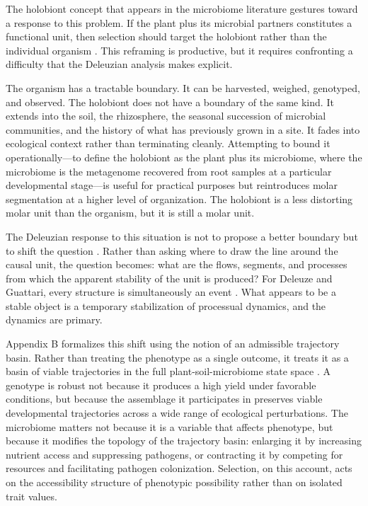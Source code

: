 \documentclass[11pt, a4paper]{article}
\begin{document}
The holobiont concept that appears in the microbiome literature gestures toward a response to this problem. If the plant plus its microbial partners constitutes a functional unit, then selection should target the holobiont rather than the individual organism \citep{gilbert2012, bosch2014}. This reframing is productive, but it requires confronting a difficulty that the Deleuzian analysis makes explicit.

The organism has a tractable boundary. It can be harvested, weighed, genotyped, and observed. The holobiont does not have a boundary of the same kind. It extends into the soil, the rhizosphere, the seasonal succession of microbial communities, and the history of what has previously grown in a site. It fades into ecological context rather than terminating cleanly. Attempting to bound it operationally---to define the holobiont as the plant plus its microbiome, where the microbiome is the metagenome recovered from root samples at a particular developmental stage---is useful for practical purposes but reintroduces molar segmentation at a higher level of organization. The holobiont is a less distorting molar unit than the organism, but it is still a molar unit.

The Deleuzian response to this situation is not to propose a better boundary but to shift the question \citep{latour2005}. Rather than asking where to draw the line around the causal unit, the question becomes: what are the flows, segments, and processes from which the apparent stability of the unit is produced? For Deleuze and Guattari, every structure is simultaneously an event \citep{bogard1998}. What appears to be a stable object is a temporary stabilization of processual dynamics, and the dynamics are primary.

Appendix B formalizes this shift using the notion of an admissible trajectory basin. Rather than treating the phenotype as a single outcome, it treats it as a basin of viable trajectories in the full plant-soil-microbiome state space \citep{kauffman1993, levin1998}. A genotype is robust not because it produces a high yield under favorable conditions, but because the assemblage it participates in preserves viable developmental trajectories across a wide range of ecological perturbations. The microbiome matters not because it is a variable that affects phenotype, but because it modifies the topology of the trajectory basin: enlarging it by increasing nutrient access and suppressing pathogens, or contracting it by competing for resources and facilitating pathogen colonization. Selection, on this account, acts on the accessibility structure of phenotypic possibility rather than on isolated trait values.
\end{document}
